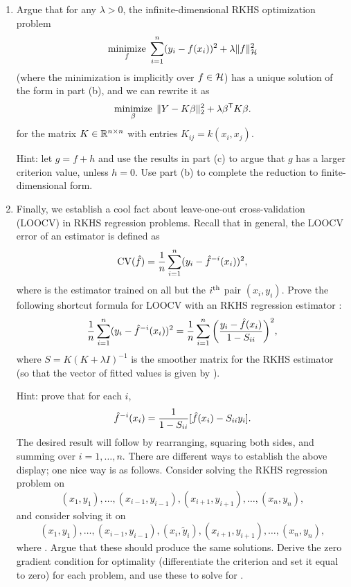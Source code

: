 \documentclass{article}
\begin{document}
\begin{enumerate}[label=(\alph*)]
\item Argue that for any $\lambda > 0$, the infinite-dimensional RKHS
  optimization problem 
  \[
  \mathop{\mathrm{minimize}}_f \; \sum_{i=1}^n (y_i - f(x_i))^2 + \lambda \|f\|_{\mathcal{H}}^2
  \]
  (where the minimization is implicitly over $f \in \mathcal{H}$) has a unique solution
  of the form in part (b), and we can rewrite it as
  \marginpar{\small [2 pts]}
  \[
  \mathop{\mathrm{minimize}}_\beta \; \|Y - K\beta\|_2^2 + \lambda \beta^{\mathsf{T}} K \beta. 
  \]
  for the matrix $K \in \mathbb{R}^{n \times n}$ with entries $K_{ij} = k(x_i, x_j)$. 

  Hint: let $g = f+h$ and use the results in part (c) to argue that $g$ has a
  larger criterion value, unless $h=0$. Use part (b) to complete the reduction
  to finite-dimensional form. 

\item Finally, we establish a cool fact about leave-one-out cross-validation
  (LOOCV) in RKHS regression problems. Recall that in general, the LOOCV error
  of an estimator \smash{$\hf$} is defined as
  \[
  \mathrm{CV}(\hat{f}) = \frac{1}{n} \sum_{i=1}^n (y_i - \hat{f}^{-i}(x_i))^2,
  \]
  where  is the estimator trained on all but the $i^{\text{th}}$ pair 
  $(x_i,y_i)$. Prove the following shortcut formula for LOOCV with an RKHS
  regression estimator \smash{$\hf$}:  
  \marginpar{\small [6 pts]}
  \[
  \frac{1}{n} \sum_{i=1}^n (y_i - \hat{f}^{-i}(x_i))^2 = 
  \frac{1}{n} \sum_{i=1}^n \bigg(\frac{y_i - \hat{f}(x_i)}{1-S_{ii}}\bigg)^2,
  \]
  where $S=K(K + \lambda I)^{-1}$ is the smoother matrix for the RKHS estimator 
  (so that the vector of fitted values is given by ). 

  Hint: prove that for each $i$,
  \[
  \hat{f}^{-i}(x_i) = \frac{1}{1-S_{ii}} [\hat{f}(x_i) - S_{ii}y_i].
  \]
  The desired result will follow by rearranging, squaring both sides, and
  summing over $i=1,\dots,n$. There are different ways to establish the above
  display; one nice way is as follows. Consider solving the RKHS regression
  problem on 
  \[
    (x_1,y_1), \dots, (x_{i-1},y_{i-1}), (x_{i+1},y_{i+1}), \dots, (x_n,y_n), 
  \]
  and consider solving it on 
  \[
    (x_1,y_1), \dots, (x_{i-1},y_{i-1}), (x_i, \tilde{y}_i), (x_{i+1},y_{i+1}),
    \dots, (x_n,y_n), 
  \]
  where . Argue that these should produce
  the same solutions. Derive the zero gradient condition for optimality
  (differentiate the criterion and set it equal to zero) for each problem, and
  use these to solve for . 
\end{enumerate}
\end{document}
